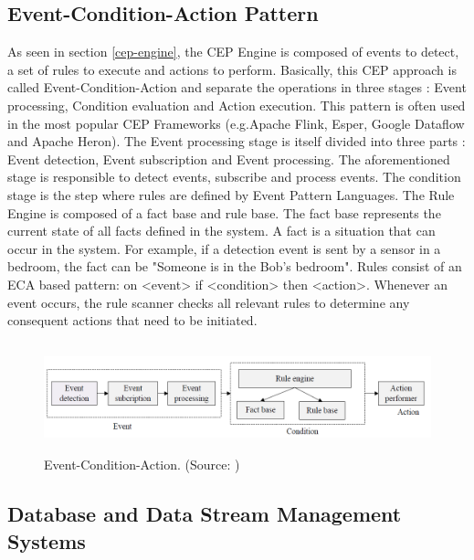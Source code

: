 \documentclass[11pt]{article}
\begin{document}

\subsection{Event-Condition-Action Pattern}

As seen in section \ref{cep-engine}, the CEP Engine is composed of events to detect, a set of rules to execute and actions to perform. Basically, this CEP approach is called Event-Condition-Action and separate the operations in three stages : Event processing, Condition evaluation and Action execution. This pattern is often used in the most popular CEP Frameworks (e.g.Apache Flink, Esper, Google Dataflow and Apache Heron). The Event processing stage is itself divided into three parts : Event detection, Event subscription and Event processing. The aforementioned stage is responsible to detect events, subscribe and process events. The condition stage is the step where rules are defined by Event Pattern Languages. The Rule Engine is composed of a fact base and rule base. The fact base represents the current state of all facts defined in the system. A fact is a situation that can occur in the system. For example, if a detection event is sent by a sensor in a bedroom, the fact can be "Someone is in the Bob's bedroom". Rules consist of an ECA based pattern: on {<}event{>} if {<}condition{>} then {<}action{>}. Whenever an event occurs, the rule scanner checks all relevant rules to determine any consequent actions that need to be initiated. \cite{An-internet-of-things-system-architecture}

\begin{figure}[h]
	\includegraphics[width=\textwidth,height=90pt]{assets/ECA_illustration.png}
	\caption[Event-Condition-Action]{
	Event-Condition-Action. (Source: \cite{An-internet-of-things-system-architecture})
	}
	\label{fig:Event-Condition-Action}
\end{figure}

\subsection{Database and Data Stream Management Systems}
\end{document}
